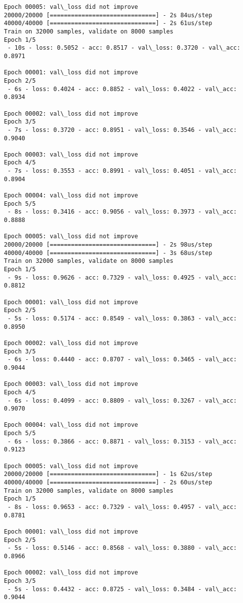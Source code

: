 \documentclass[11pt]{article}
\begin{document}
\begin{Verbatim}[commandchars=\\\{\}]
Epoch 00005: val\_loss did not improve
20000/20000 [==============================] - 2s 84us/step
40000/40000 [==============================] - 2s 61us/step
Train on 32000 samples, validate on 8000 samples
Epoch 1/5
 - 10s - loss: 0.5052 - acc: 0.8517 - val\_loss: 0.3720 - val\_acc: 0.8971

Epoch 00001: val\_loss did not improve
Epoch 2/5
 - 6s - loss: 0.4024 - acc: 0.8852 - val\_loss: 0.4022 - val\_acc: 0.8934

Epoch 00002: val\_loss did not improve
Epoch 3/5
 - 7s - loss: 0.3720 - acc: 0.8951 - val\_loss: 0.3546 - val\_acc: 0.9040

Epoch 00003: val\_loss did not improve
Epoch 4/5
 - 7s - loss: 0.3553 - acc: 0.8991 - val\_loss: 0.4051 - val\_acc: 0.8904

Epoch 00004: val\_loss did not improve
Epoch 5/5
 - 8s - loss: 0.3416 - acc: 0.9056 - val\_loss: 0.3973 - val\_acc: 0.8888

Epoch 00005: val\_loss did not improve
20000/20000 [==============================] - 2s 98us/step
40000/40000 [==============================] - 3s 68us/step
Train on 32000 samples, validate on 8000 samples
Epoch 1/5
 - 9s - loss: 0.9626 - acc: 0.7329 - val\_loss: 0.4925 - val\_acc: 0.8812

Epoch 00001: val\_loss did not improve
Epoch 2/5
 - 5s - loss: 0.5174 - acc: 0.8549 - val\_loss: 0.3863 - val\_acc: 0.8950

Epoch 00002: val\_loss did not improve
Epoch 3/5
 - 6s - loss: 0.4440 - acc: 0.8707 - val\_loss: 0.3465 - val\_acc: 0.9044

Epoch 00003: val\_loss did not improve
Epoch 4/5
 - 6s - loss: 0.4099 - acc: 0.8809 - val\_loss: 0.3267 - val\_acc: 0.9070

Epoch 00004: val\_loss did not improve
Epoch 5/5
 - 6s - loss: 0.3866 - acc: 0.8871 - val\_loss: 0.3153 - val\_acc: 0.9123

Epoch 00005: val\_loss did not improve
20000/20000 [==============================] - 1s 62us/step
40000/40000 [==============================] - 2s 60us/step
Train on 32000 samples, validate on 8000 samples
Epoch 1/5
 - 8s - loss: 0.9653 - acc: 0.7329 - val\_loss: 0.4957 - val\_acc: 0.8781

Epoch 00001: val\_loss did not improve
Epoch 2/5
 - 5s - loss: 0.5146 - acc: 0.8568 - val\_loss: 0.3880 - val\_acc: 0.8966

Epoch 00002: val\_loss did not improve
Epoch 3/5
 - 5s - loss: 0.4432 - acc: 0.8725 - val\_loss: 0.3484 - val\_acc: 0.9044


\end{Verbatim}
\end{document}
